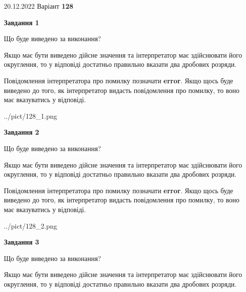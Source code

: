 \documentclass[12pt, ukrainian]{article}
\begin{document}
{20.12.2022 Варіант \No \textbf { 128 }\par}
{
\begin {Large}

{\begin {center}\textbf{Завдання 1}\end {center}}\par
Що буде виведено за виконання? \par

Якщо має бути виведено дійсне значення та інтерпретатор має здійснювати його округлення, 
то у відповіді достатньо правильно вказати два дробових розряди.

Повідомлення інтерпретатора про помилку позначати \textbf{error}.
Якщо щось буде виведено до того, як інтерпретатор видасть повідомлення про помилку, 
то воно має вказуватись у відповіді. \par

\begin{center}
	{../pict/128_1.png}
\end{center}
\newpage

{\begin {center}\textbf{Завдання 2}\end {center}}\par
Що буде виведено за виконання? \par

Якщо має бути виведено дійсне значення та інтерпретатор має здійснювати його округлення, 
то у відповіді достатньо правильно вказати два дробових розряди.

Повідомлення інтерпретатора про помилку позначати \textbf{error}.
Якщо щось буде виведено до того, як інтерпретатор видасть повідомлення про помилку, 
то воно має вказуватись у відповіді. \par

\begin{center}
	{../pict/128_2.png}
\end{center}
\newpage

{\begin {center}\textbf{Завдання 3}\end {center}}\par
Що буде виведено за виконання? \par

Якщо має бути виведено дійсне значення та інтерпретатор має здійснювати його округлення, 
то у відповіді достатньо правильно вказати два дробових розряди.


\end{Large}}
\end{document}
